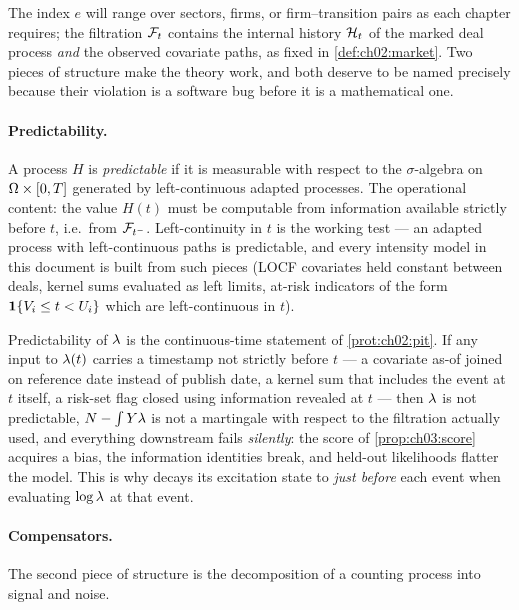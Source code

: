 The index $e$ will range over sectors, firms, or firm--transition pairs as
each chapter requires; the filtration $\mathcal{F}_{t}$ contains the internal history
$\mathcal{H}_t$ of the marked deal process \emph{and} the observed covariate
paths, as fixed in \cref{def:ch02:market}. Two pieces of structure make the
theory work, and both deserve to be named precisely because their violation
is a software bug before it is a mathematical one.

\paragraph{Predictability.}
A process $H$ is \emph{predictable} if it is measurable with respect to the
$\sigma$-algebra on $\Omega \times [0,T]$ generated by left-continuous
adapted processes. The operational content: the value $H(t)$ must be
computable from information available strictly before $t$, i.e.\ from
$\mathcal{F}_{t^-}$. Left-continuity in $t$ is the working test --- an adapted process
with left-continuous paths is predictable, and every intensity model in
this document is built from such pieces (LOCF covariates held constant
between deals, kernel sums evaluated as left limits, at-risk indicators of
the form $\mathbf{1}\{V_i \le t < U_i\}$ which are left-continuous in $t$).

\begin{warning}\label{warn:ch03:lookahead}
Predictability of $\lambda$ is the continuous-time statement of
\cref{prot:ch02:pit}. If any input to $\lambda(t)$ carries a timestamp not
strictly before $t$ --- a covariate as-of joined on reference date instead
of publish date, a kernel sum that includes the event at $t$ itself, a
risk-set flag closed using information revealed at $t$ --- then $\lambda$ is
not predictable, $N - \int Y\lambda$ is not a martingale with respect to
the filtration actually used, and everything downstream fails
\emph{silently}: the score of \cref{prop:ch03:score} acquires a bias, the
information identities break, and held-out likelihoods flatter the model.
This is why  decays its excitation state
to \emph{just before} each event when evaluating $\log\lambda$ at that event.
\end{warning}

\paragraph{Compensators.}
The second piece of structure is the decomposition of a counting process
into signal and noise.

